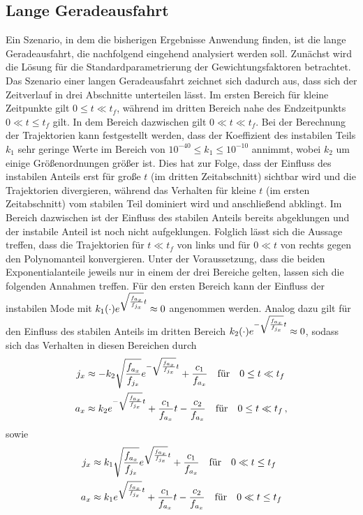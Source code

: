 \subsection{Lange Geradeausfahrt}
Ein Szenario, in dem die bisherigen Ergebnisse Anwendung finden, ist die lange Geradeausfahrt, die nachfolgend eingehend analysiert werden soll. Zunächst wird die Lösung für die Standardparametrierung der Gewichtungsfaktoren betrachtet. Das Szenario einer langen Geradeausfahrt zeichnet sich dadurch aus, dass sich der Zeitverlauf in drei Abschnitte unterteilen lässt. Im ersten Bereich für kleine Zeitpunkte gilt $0\leq t\ll t_f$, während im dritten Bereich nahe des Endzeitpunkts $0\ll t\leq t_f$ gilt. In dem Bereich dazwischen gilt $0\ll t\ll t_f$. Bei der Berechnung der Trajektorien kann festgestellt werden, dass der Koeffizient des instabilen Teils $k_1$ sehr geringe Werte im Bereich von $10^{-40}\leq k_1 \leq 10^{-10}$ annimmt, wobei $k_2$ um einige Größenordnungen größer ist. Dies hat zur Folge, dass der Einfluss des instabilen Anteils erst für große $t$ (im dritten Zeitabschnitt) sichtbar wird und die Trajektorien divergieren, während das Verhalten für kleine $t$ (im ersten Zeitabschnitt) vom stabilen Teil dominiert wird und anschließend abklingt. Im Bereich dazwischen ist der Einfluss des stabilen Anteils bereits abgeklungen und der instabile Anteil ist noch nicht aufgeklungen. Folglich lässt sich die Aussage treffen, dass die Trajektorien für $t\ll t_f$ von links und für $0\ll t$ von rechts gegen den Polynomanteil konvergieren. Unter der Voraussetzung, dass die beiden Exponentialanteile jeweils nur in einem der drei Bereiche gelten, lassen sich die folgenden Annahmen treffen. Für den ersten Bereich kann der Einfluss der instabilen Mode mit $k_1(\cdot)e^{\sqrt{\frac{f_{a_x}}{f_{j_x}}}t} \approx 0$ angenommen werden. Analog dazu gilt für den Einfluss des stabilen Anteils im dritten Bereich $k_2(\cdot)e^{-\sqrt{\frac{f_{a_x}}{f_{j_x}}}t} \approx 0$, sodass sich das Verhalten in diesen Bereichen durch 
\begin{align}
j_x &\approx -k_2\sqrt{\frac{f_{a_x}}{f_{j_x}}}e^{-\sqrt{\frac{f_{a_x}}{f_{j_x}}}t} + \frac{c_1}{f_{a_x}} \quad\textrm{für}\quad 0\leq t\ll t_f  \label{eq:j_Bereich_1} \\
a_x &\approx k_2e^{-\sqrt{\frac{f_{a_x}}{f_{j_x}}}t} + \frac{c_1}{f_{a_x}}t - \frac{c_2}{f_{a_x}} \quad\textrm{für}\quad 0\leq t\ll t_f\,, \label{eq:a_Bereich_1}
\end{align}
sowie 
\begin{align}
j_x &\approx k_1\sqrt{\frac{f_{a_x}}{f_{j_x}}}e^{\sqrt{\frac{f_{a_x}}{f_{j_x}}}t} + \frac{c_1}{f_{a_x}} \quad\textrm{für}\quad 0\ll t\leq t_f \label{eq:j_Bereich_3} \\
a_x &\approx k_1e^{\sqrt{\frac{f_{a_x}}{f_{j_x}}}t} + \frac{c_1}{f_{a_x}}t - \frac{c_2}{f_{a_x}} \quad\textrm{für}\quad 0\ll t\leq t_f \label{eq:a_Bereich_3}
\end{align}
